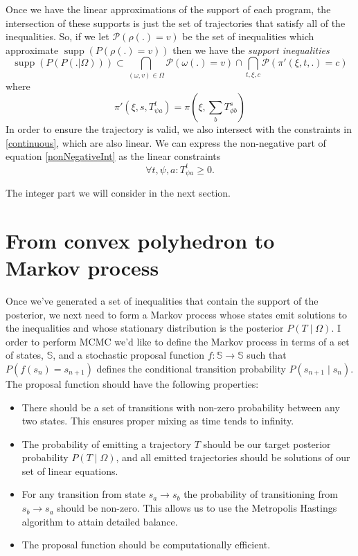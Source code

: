 \documentclass{article}
\DeclareMathOperator\supp{supp}
\begin{document}
Once we have the linear approximations of the support of each program, the intersection of these supports is just the set of trajectories that satisfy all of the inequalities. So, if we let $\mathcal{P}(\rho(.)=v)$ be the set of inequalities which approximate $\supp(P(\rho(.)=v))$ then we have the \textit{support inequalities}
\begin{equation}
\supp(P(P(.|\Omega))) \subset \bigcap_{(\omega,v) \in \Omega}  \mathcal{P}(\omega(.) = v) \cap \bigcap_{t, \xi, c} \mathcal{P}(\pi'(\xi,t,.)=c)
\label{linearSupport}
\end{equation}
where
\[
\pi'(\xi, s, T^t_{\psi a}) = \pi(\xi,\sum_bT^{s}_{\phi b})
\]
In order to ensure the trajectory is valid, we also intersect with the constraints in \ref{continuous}, which are also linear. We can express the non-negative part of equation \ref{nonNegativeInt} as the linear constraints
\begin{equation}
\forall t, \psi, a: T^t_{\psi a} \ge 0.
\label{nonNegative}
\end{equation}

The integer part we will consider in the next section.

\section{From convex polyhedron to Markov process}

Once we've generated a set of inequalities that contain the support of the posterior, we next need to form a Markov process whose states emit solutions to the inequalities and whose stationary distribution is the posterior $P(T \mid \Omega)$. I order to perform MCMC we'd like to define the Markov process in terms of a set of states, $\mathbb{S}$, and a stochastic proposal function $f:\mathbb{S} \to \mathbb{S}$ such that $P(f(s_n) = s_{n+1})$ defines the conditional transition probability $P(s_{n+1} \mid s_n)$. The proposal function should have the following properties:
\begin{itemize}
\item There should be a set of transitions with non-zero probability between any two states. This ensures proper mixing as time tends to infinity.

\item The probability of emitting a trajectory $T$ should be our target posterior probability $P(T \mid \Omega)$, and all emitted trajectories should be solutions of our set of linear equations.

\item For any transition from state $s_a \to s_b$ the probability of transitioning from $s_b \to s_a$ should be non-zero. This allows us to use the Metropolis Hastings algorithm to attain detailed balance.

\item The proposal function should be computationally efficient. 
\end{itemize}
\end{document}
